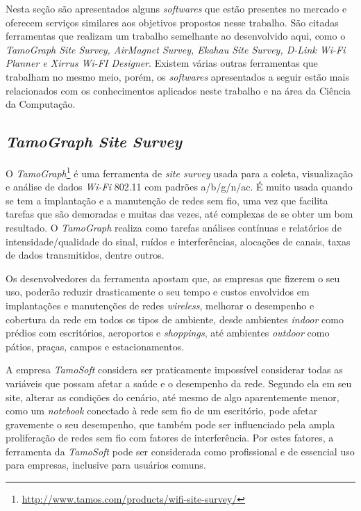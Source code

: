 \documentclass[
	12pt,				%
	twoside,			%
	a4paper,			%
	english,			%
	french,				%
	spanish,			%
	brazil				%
	]{abntex2}
\begin{document}
Nesta seção são apresentados alguns \emph{softwares} que estão presentes
no mercado e oferecem serviços similares aos objetivos propostos nesse
trabalho. São citadas ferramentas que realizam um trabalho semelhante ao
desenvolvido aqui, como o \emph{TamoGraph Site Survey, AirMagnet Survey,
Ekahau Site Survey, D-Link Wi-Fi Planner e Xirrus Wi-FI Designer}.
Existem várias outras ferramentas que trabalham no mesmo meio, porém, os
\emph{softwares} apresentados a seguir estão mais relacionados com os
conhecimentos aplicados neste trabalho e na área da Ciência da
Computação.

\subsection{\texorpdfstring{\emph{TamoGraph Site
Survey}}{TamoGraph Site Survey}}\label{tamograph-site-survey}

O \emph{TamoGraph}\footnote{\url{http://www.tamos.com/products/wifi-site-survey/}}
é uma ferramenta de \emph{site survey} usada para a coleta, visualização
e análise de dados \emph{Wi-Fi} 802.11 com padrões a/b/g/n/ac. É muito
usada quando se tem a implantação e a manutenção de redes sem fio, uma
vez que facilita tarefas que são demoradas e muitas das vezes, até
complexas de se obter um bom resultado. O \emph{TamoGraph} realiza como
tarefas análises contínuas e relatórios de intensidade/qualidade do
sinal, ruídos e interferências, alocações de canais, taxas de dados
transmitidos, dentre outros.

Os desenvolvedores da ferramenta apostam que, as empresas que fizerem o
seu uso, poderão reduzir drasticamente o seu tempo e custos envolvidos
em implantações e manutenções de redes \emph{wireless}, melhorar o
desempenho e cobertura da rede em todos os tipos de ambiente, desde
ambientes \emph{indoor} como prédios com escritórios, aeroportos e
\emph{shoppings}, até ambientes \emph{outdoor} como pátios, praças,
campos e estacionamentos.

A empresa \emph{TamoSoft} considera ser praticamente impossível
considerar todas as variáveis que possam afetar a saúde e o desempenho
da rede. Segundo ela em seu site, alterar as condições do cenário, até
mesmo de algo aparentemente menor, como um \emph{notebook} conectado à
rede sem fio de um escritório, pode afetar gravemente o seu desempenho,
que também pode ser influenciado pela ampla proliferação de redes sem
fio com fatores de interferência. Por estes fatores, a ferramenta da
\emph{TamoSoft} pode ser considerada como profissional e de essencial
uso para empresas, inclusive para usuários comuns.
\end{document}
